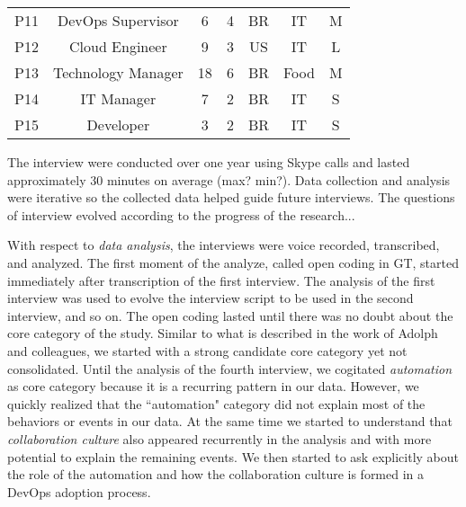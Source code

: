\begin{table}[t]
\begin{tabular}{ccccccc}
P11                  & DevOps Supervisor                & 6            & 4           & BR            & IT                  & M                               \\

P12                  & Cloud Engineer              & 9            & 3           & US            & IT                  & L                               \\

P13                  & Technology Manager                 & 18            & 6           & BR            & Food                  & M                               \\

P14                  & IT Manager            & 7            & 2           & BR            & IT                  & S                               \\

P15                  & Developer        & 3            & 2           & BR            & IT                  & S
\end{tabular}
\end{table}



The interview were conducted over one year using Skype calls and lasted
approximately 30 minutes on average (max? min?).
Data collection and analysis were iterative so the collected data helped guide
future interviews. {\color{red}The questions of interview evolved according to the progress
of the research...} 

With respect to \emph{data analysis}, the interviews were voice recorded, transcribed, and analyzed. The first moment
of the analyze, called open coding in GT, started immediately after
transcription of the first interview. The analysis of the
first interview was used to evolve the interview script to be used in
the second interview, and so on. The open coding lasted until there was no
doubt about the core category of the study. Similar to what is described in
the work of Adolph and colleagues\cite{adolph2012reconciling}, we started
with a strong candidate core category yet not consolidated. Until
the analysis of the fourth interview, we cogitated \emph{automation} as core
category because it is a recurring pattern in our data. However, we quickly
realized that the ``automation" category did not explain most of the behaviors
or events in our data. At the same time we started to understand that 
\emph{collaboration culture} also appeared recurrently in the analysis and with more
potential to explain the remaining events. We then started to ask explicitly
about the role of the automation and how the collaboration culture is formed
in a DevOps adoption process.

